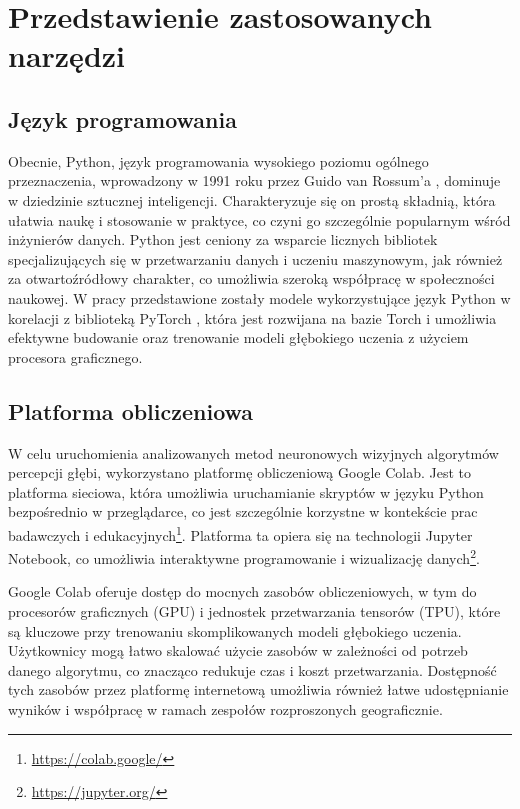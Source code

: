\chapter{Przedstawienie zastosowanych narzędzi}\label{chap:przedstawienie_zastosowanych_narzędzi}

\section{Język programowania}
Obecnie, Python, język programowania wysokiego poziomu ogólnego przeznaczenia, wprowadzony w 1991 roku przez Guido van Rossum’a \cite{Python}, dominuje w dziedzinie sztucznej inteligencji. Charakteryzuje się on prostą składnią, która ułatwia naukę i stosowanie w praktyce, co czyni go szczególnie popularnym wśród inżynierów danych. Python jest ceniony za wsparcie licznych bibliotek specjalizujących się w przetwarzaniu danych i uczeniu maszynowym, jak również za otwartoźródłowy charakter, co umożliwia szeroką współpracę w społeczności naukowej. W pracy przedstawione zostały modele wykorzystujące język Python w korelacji z biblioteką PyTorch \cite{paszke2019}, która jest rozwijana na bazie Torch i umożliwia efektywne budowanie oraz trenowanie modeli głębokiego uczenia z użyciem procesora graficznego.

\section{Platforma obliczeniowa}
W celu uruchomienia analizowanych metod neuronowych wizyjnych algorytmów percepcji głębi, wykorzystano platformę obliczeniową Google Colab. Jest to platforma sieciowa, która umożliwia uruchamianie skryptów w języku Python bezpośrednio w przeglądarce, co jest szczególnie korzystne w kontekście prac badawczych i edukacyjnych\footnote{\href{https://colab.google/}{https://colab.google/}}. Platforma ta opiera się na technologii Jupyter Notebook, co umożliwia interaktywne programowanie i wizualizację danych\footnote{\href{https://jupyter.org/}{https://jupyter.org/}}.

Google Colab oferuje dostęp do mocnych zasobów obliczeniowych, w tym do procesorów graficznych (GPU) i jednostek przetwarzania tensorów (TPU), które są kluczowe przy trenowaniu skomplikowanych modeli głębokiego uczenia. Użytkownicy mogą łatwo skalować użycie zasobów w zależności od potrzeb danego algorytmu, co znacząco redukuje czas i koszt przetwarzania. Dostępność tych zasobów przez platformę internetową umożliwia również łatwe udostępnianie wyników i współpracę w ramach zespołów rozproszonych geograficznie.

